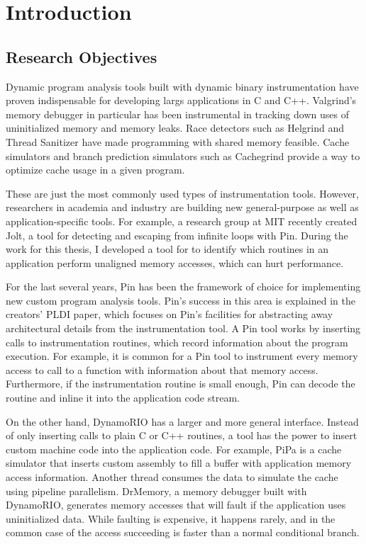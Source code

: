 \chapter{Introduction}

\section{Research Objectives}

Dynamic program analysis tools built with dynamic binary instrumentation have
proven indispensable for developing largs applications in C and C++.
Valgrind's\cite{valgrind} memory debugger in particular has been instrumental in
tracking down uses of uninitialized memory and memory leaks.  Race detectors
such as Helgrind\cite{helgrind} and Thread Sanitizer\cite{tsan} have made
programming with shared memory feasible.  Cache simulators and branch prediction
simulators such as Cachegrind\cite{valgrind_workloads} provide a way to optimize
cache usage in a given program.

These are just the most commonly used types of instrumentation tools.  However,
researchers in academia and industry are building new general-purpose as well as
application-specific tools.  For example, a research group at MIT recently
created Jolt\cite{jolt}, a tool for detecting and escaping from infinite loops
with Pin\cite{pin}.  During the work for this thesis, I developed a tool for to
identify which routines in an application perform unaligned memory accesses,
which can hurt performance.

For the last several years, Pin has been the framework of choice for
implementing new custom program analysis tools.  Pin's success in this area is
explained in the creators' PLDI paper, which focuses on Pin's facilities for
abstracting away architectural details from the instrumentation tool.  A Pin
tool works by inserting calls to instrumentation routines, which record
information about the program execution.  For example, it is common for a Pin
tool to instrument every memory access to call to a function with information
about that memory access.  Furthermore, if the instrumentation routine is small
enough, Pin can decode the routine and inline it into the application code
stream.

On the other hand, DynamoRIO\cite{bruening_phd} has a larger and more general
interface.  Instead of only inserting calls to plain C or C++ routines, a tool
has the power to insert custom machine code into the application code.  For
example, PiPa\cite{pipa} is a cache simulator that inserts custom assembly to
fill a buffer with application memory access information.  Another thread
consumes the data to simulate the cache using pipeline parallelism.  DrMemory,
a memory debugger built with DynamoRIO, generates memory accesses that will
fault if the application uses uninitialized data.  While faulting is expensive,
it happens rarely, and in the common case of the access succeeding is faster
than a normal conditional branch.

